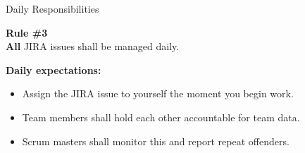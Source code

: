 \documentclass[10pt]{beamer}
\begin{document}

\begin{frame}{Daily Responsibilities}%
  \begin{mdframed}[style=HavasuLightBlueStyle]%
    \textbf{Rule \#3}\\%
    \textbf{All} JIRA issues shall be managed daily.
  \end{mdframed}%
  \begin{mdframed}[style=HavasuLightGreenStyle]%
    \textbf{Daily expectations:}%
    \begin{itemize}%
      \item Assign the JIRA issue to yourself the moment you begin work.
      \item Team members shall hold each other accountable for team data.
      \item Scrum masters shall monitor this and report repeat offenders.
    \end{itemize}%
  \end{mdframed}%
\end{frame}%

\end{document}
